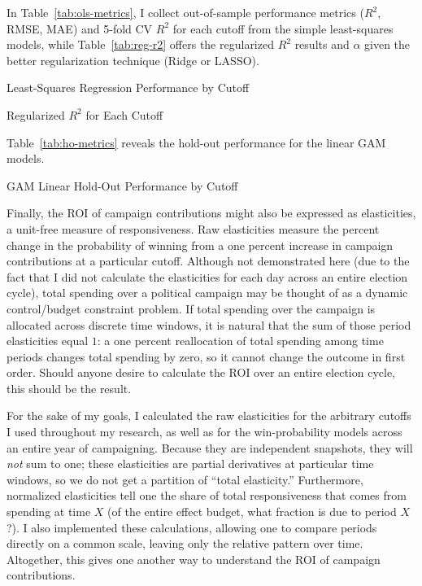 In Table~\ref{tab:ols-metrics}, I collect out-of-sample performance metrics ($R^2$, RMSE, MAE) and 5-fold CV $R^2$ for each cutoff from the simple least-squares models, while Table~\ref{tab:reg-r2} offers the regularized $R^2$ results and $\alpha$ given the better regularization technique (Ridge or LASSO).

\begin{table}[H]
	\centering
	\begin{minipage}{0.48\textwidth}
		\centering
		
		\caption{Least-Squares Regression Performance by Cutoff}
		\label{tab:ols-metrics}
	\end{minipage}\hfill
	\begin{minipage}{0.48\textwidth}
		\centering
		
		\caption{Regularized $R^2$ for Each Cutoff}
		\label{tab:reg-r2}
	\end{minipage}
\end{table}

Table~\ref{tab:ho-metrics} reveals the hold-out performance for the linear GAM models.

\begin{table}[H]
	\centering
	
	\caption{GAM Linear Hold-Out Performance by Cutoff}
	\label{tab:ho-metrics}
\end{table}

Finally, the ROI of campaign contributions might also be expressed as elasticities, a unit-free measure of responsiveness. Raw elasticities measure the percent change in the probability of winning from a one percent increase in campaign contributions at a particular cutoff. Although not demonstrated here (due to the fact that I did not calculate the elasticities for each day across an entire election cycle), total spending over a political campaign may be thought of as a dynamic control/budget constraint problem. If total spending over the campaign is allocated across discrete time windows, it is natural that the sum of those period elasticities equal $1$: a one percent reallocation of total spending among time periods changes total spending by zero, so it cannot change the outcome in first order. Should anyone desire to calculate the ROI over an entire election cycle, this should be the result. 

For the sake of my goals, I calculated the raw elasticities for the arbitrary cutoffs I used throughout my research, as well as for the win-probability models across an entire year of campaigning. Because they are independent snapshots, they will \textit{not} sum to one; these elasticities are partial derivatives at particular time windows, so we do not get a partition of ``total elasticity.'' Furthermore, normalized elasticities tell one the share of total responsiveness that comes from spending at time $X$ (of the entire effect budget, what fraction is due to period $X$?). I also implemented these calculations, allowing one to compare periods directly on a common scale, leaving only the relative pattern over time. Altogether, this gives one another way to understand the ROI of campaign contributions.

